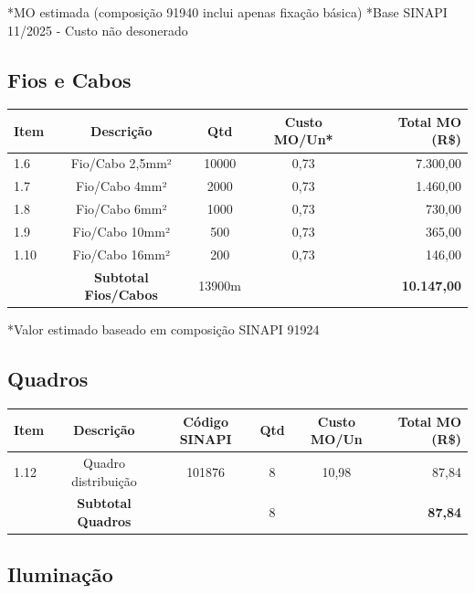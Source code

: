 \documentclass[12pt,a4paper]{article}
\renewenvironment{table}%
{\begin{center}%
\scriptsize%
\addtolength{\tabcolsep}{-2pt}%
}%
{\end{center}}
\begin{document}
\noindent\small{*MO estimada (composição 91940 inclui apenas fixação básica)}
\noindent\small{*Base SINAPI 11/2025 - Custo não desonerado}

\subsection{Fios e Cabos}

\begin{table}
\centering
\begin{tabular}{lcccr}
\toprule
\textbf{Item} & \textbf{Descrição} & \textbf{Qtd} & \textbf{Custo MO/Un*} & \textbf{Total MO (R\$)} \\
\midrule
1.6 & Fio/Cabo 2,5mm² & 10000 & 0,73 & 7.300,00 \\
1.7 & Fio/Cabo 4mm² & 2000 & 0,73 & 1.460,00 \\
1.8 & Fio/Cabo 6mm² & 1000 & 0,73 & 730,00 \\
1.9 & Fio/Cabo 10mm² & 500 & 0,73 & 365,00 \\
1.10 & Fio/Cabo 16mm² & 200 & 0,73 & 146,00 \\
\midrule
 & \textbf{Subtotal Fios/Cabos} & 13900m & & \textbf{10.147,00} \\
\bottomrule
\end{tabular}
\end{table}

\noindent\small{*Valor estimado baseado em composição SINAPI 91924}

\pagebreak

\subsection{Quadros}

\begin{table}
\centering
\begin{tabular}{lccccr}
\toprule
\textbf{Item} & \textbf{Descrição} & \textbf{Código SINAPI} & \textbf{Qtd} & \textbf{Custo MO/Un} & \textbf{Total MO (R\$)} \\
\midrule
1.12 & Quadro distribuição & 101876 & 8 & 10,98 & 87,84 \\
\midrule
 & \textbf{Subtotal Quadros} & & 8 & & \textbf{87,84} \\
\bottomrule
\end{tabular}
\end{table}

\subsection{Iluminação}
\end{document}
